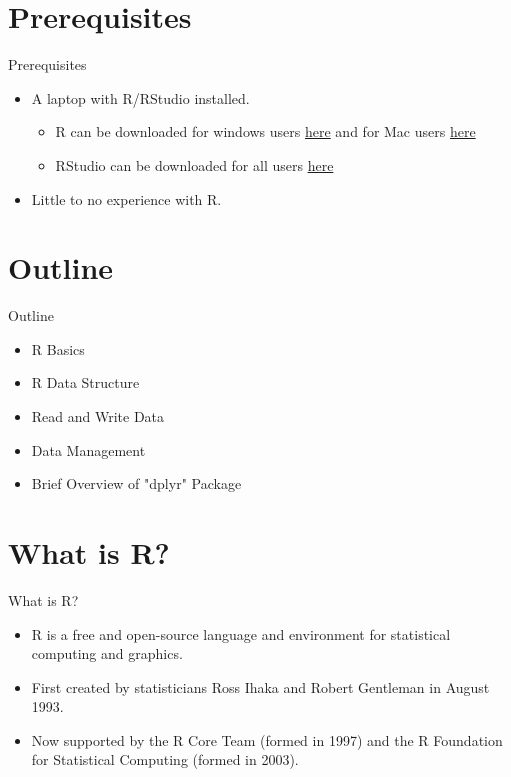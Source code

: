 \documentclass{beamer}
\begin{document}
\section{Prerequisites}

\begin{frame}{Prerequisites}

\begin{itemize}
    \item A laptop with R/RStudio installed.
    \begin{itemize}
        \item R can be downloaded for windows users \href{https://cran.r-project.org/bin/windows/base/}{here} and for Mac users \href{https://cran.r-project.org/bin/macosx/}{here}
        \item RStudio can be downloaded for all users \href{https://www.rstudio.com/products/rstudio/download/}{here}
    \end{itemize}
    \item Little to no experience with R.
\end{itemize}
    
\end{frame}

\section{Outline}

\begin{frame}{Outline}
    
\begin{itemize}
    \item R Basics
    \item R Data Structure
    \item Read and Write Data
    \item Data Management
    \item Brief Overview of "dplyr" Package
\end{itemize}
    
\end{frame}

\section{What is R?}

\begin{frame}{What is R?}
    \begin{itemize}
        \item R is a free and open-source language and environment for statistical computing and graphics.
        \item First created by statisticians Ross Ihaka and Robert Gentleman in August 1993.
        \item Now supported by the R Core Team (formed in 1997) and the R Foundation for Statistical Computing (formed in 2003).
    \end{itemize}
\end{frame}
\end{document}
